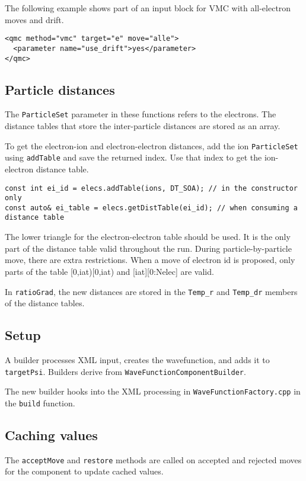 The following example shows part of an input block for VMC with all-electron moves and drift.

\begin{verbatim}
<qmc method="vmc" target="e" move="alle">
  <parameter name="use_drift">yes</parameter>
</qmc>
\end{verbatim}



\subsection{Particle distances}

The \texttt{ParticleSet} parameter in these functions refers to the electrons.
The distance tables that store the inter-particle distances are stored as an array.

To get the electron-ion and electron-electron distances, add the ion \texttt{ParticleSet} using \texttt{addTable}
and save the returned index. Use that index to get the ion-electron distance table.
\begin{verbatim}
const int ei_id = elecs.addTable(ions, DT_SOA); // in the constructor only
const auto& ei_table = elecs.getDistTable(ei_id); // when consuming a distance table
\end{verbatim}

The lower triangle for the electron-electron table should be used.
It is the only part of the distance table valid throughout the run.
During particle-by-particle move, there are extra restrictions.
When a move of electron id is proposed, only parts of the table [0,iat)[0,iat) and [iat][0:Nelec] are valid.

In \texttt{ratioGrad}, the new distances are stored in the \texttt{Temp\_r} and \texttt{Temp\_dr}
members of the distance tables.

\subsection{Setup}

A builder processes XML input, creates the wavefunction, and adds it to \texttt{targetPsi}.
Builders derive from \texttt{WaveFunctionComponentBuilder}.

The new builder hooks into the XML processing in \texttt{WaveFunctionFactory.cpp} in the \texttt{build} function.


\subsection{Caching values}
The \texttt{acceptMove} and \texttt{restore} methods are called on accepted and rejected moves for
the component to update cached values.


